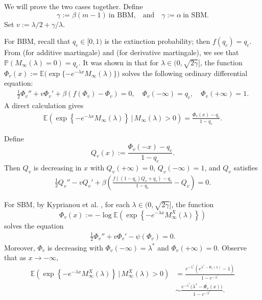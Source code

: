 \documentclass[10pt,a4paper]{amsart}
\numberwithin{equation}{section}
\begin{document}
We will prove the two cases together. Define
\[
\gamma:= \beta(m-1)\ \mbox{in BBM,} \quad \mbox{and}\quad 
\gamma := \alpha\ \mbox{in SBM}.
\]
Set $v := \lambda/2 + \gamma/\lambda$. 

For BBM, 
recall that $q_c \in [0,1)$ is
the extinction probability; then $f(q_c) = q_c$. From \cite[Theorem 1.2]{BK1997} (for additive martingale) and \cite[Proposition A.3(iii)]{Aidekon} (for derivative martingale), we see that $\mathbb{P}(M_\infty(\lambda) = 0) = q_c$.  
It was shown in \cite{K04}  that for $\lambda \in (0, \sqrt{2\gamma}]$, the function $\Phi_v(x) := \mathbb{E}\bigl(\exp\{-e^{-\lambda x} M_\infty(\lambda)\}\bigr)$ solves the following ordinary differential equation:
\begin{align*}
	\frac{1}{2}\Phi_v'' + v \Phi_v' + \beta(f(\Phi_v) - \Phi_v) = 0
, \quad  \Phi_v(-\infty)=q_c,\quad \Phi_v(+\infty)=1.
\end{align*}
A direct calculation gives
\begin{align}\label{Laplace-BBM}
	\mathbb{E}\left(\exp\left\{-e^{-\lambda x} M_\infty(\lambda)\right\} \,\Big|\, M_\infty(\lambda) > 0\right) = \frac{\Phi_v(x) - q_c}{1 - q_c}
	.
\end{align}

Define
\[
Q_v(x) := \frac{\Phi_v(-x) - q_c}{1 - q_c}.
\]
Then $Q_v$ is decreasing in $x$ with $Q_v(+\infty) = 0$, $Q_v(-\infty) = 1$, and $Q_v$ satisfies
\begin{align}\label{ODE2}
	\frac{1}{2} Q_v'' - v Q_v' + \beta\left( \frac{f((1 - q_c)Q_v + q_c) - q_c}{1 - q_c} - Q_v \right) = 0.
\end{align}

For SBM, by Kyprianou et al. \cite{KLMR12}, for each $\lambda \in (0, \sqrt{2\gamma}]$, the function
\[
\Phi_v(x) := -\log \mathbb{E}\left(\exp\left\{-e^{-\lambda x} M_\infty^X(\lambda)\right\}\right)
\]
solves the equation
\begin{align*}
	\frac{1}{2}\Phi_v'' + v \Phi_v' - \psi(\Phi_v) = 0.
\end{align*}
Moreover, $\Phi_v$ is decreasing with $\Phi_v(-\infty) = \lambda^*$ and $\Phi_v(+\infty) = 0$. 
Observe that as $x \to -\infty$, 
\begin{align}\label{Laplace-SBM}
	\mathbb{E}
	\left(\exp\left\{-e^{-\lambda x} M_\infty^X(\lambda)\right\} \,\Big|\, M_\infty^X(\lambda) > 0\right)
	& = \frac{e^{-\lambda^*}\left(e^{\lambda^* - \Phi_v(x)} - 1\right)}{1 - e^{-\lambda^*}} \nonumber\\
	&\sim \frac{e^{-\lambda^*}\bigl(\lambda^* - \Phi_v(x)\bigr)}{1 - e^{-\lambda^*}}
	.
\end{align}
\end{document}
